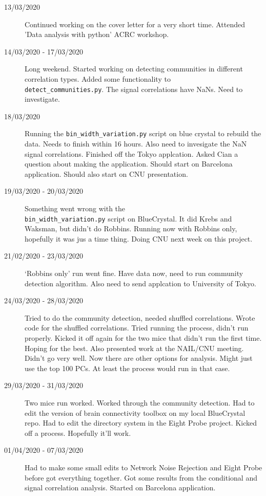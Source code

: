 \documentclass[a4paper,12pt]{article}
\theoremstyle{definition}
\begin{document}
\begin{description}
	\item[13/03/2020] Continued working on the cover letter for a very short time. Attended 'Data analysis with python' ACRC workshop.

	\item[14/03/2020 - 17/03/2020] Long weekend. Started working on detecting communities in different correlation types. Added some functionality to \\ \texttt{detect\_communities.py}. The signal correlations have NaNs. Need to investigate.

	\item[18/03/2020] Running the \texttt{bin\_width\_variation.py} script on blue crystal to rebuild the data. Needs to finish within 16 hours. Also need to invesigate the NaN signal correlations. Finished off the Tokyo applcation. Asked Cian a question about making the application. Should start on Barcelona application. Should also start on CNU presentation.

	\item[19/03/2020 - 20/03/2020] Something went wrong with the \\ \texttt{bin\_width\_variation.py} script on BlueCrystal. It did Krebs and Waksman, but didn't do Robbins. Running now with Robbins only, hopefully it was jus a time thing. Doing CNU next week on this project.

	\item[21/02/2020 - 23/03/2020] `Robbins only' run went fine. Have data now, need to run community detection algorithm. Also need to send applcation to University of Tokyo.

	\item[24/03/2020 - 28/03/2020] Tried to do the community detection, needed shuffled correlations. Wrote code for the shuffled correlations. Tried running the process, didn't run properly. Kicked it off again for the two mice that didn't run the first time. Hoping for the best. Also presented work at the NAIL/CNU meeting. Didn't go very well. Now there are other options for analysis. Might just use the top 100 PCs. At least the process would run in that case.

	\item[29/03/2020 - 31/03/2020] Two mice run worked. Worked through the community detection. Had to edit the version of brain connectivity toolbox on my local BlueCrystal repo. Had to edit the directory system in the Eight Probe project. Kicked off a process. Hopefully it'll work.

	\item[01/04/2020 - 07/03/2020] Had to make some small edits to Network Noise Rejection and Eight Probe before got everything together. Got some results from the conditional and signal correlation analysis. Started on Barcelona application.


\end{description}
\end{document}
